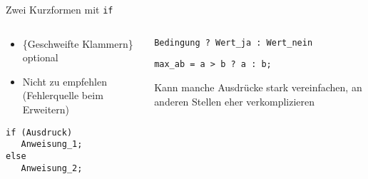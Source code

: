 
\begin{frame}[fragile]{Zwei Kurzformen mit \texttt{if}}
%
\begin{columns}[T]
\begin{tcolorbox}[title=\emph{Einzeilige} \texttt{if}-Blöcke]
\begin{itemize}
\item \{Geschweifte Klammern\} optional
\item Nicht zu empfehlen\newline
	(Fehlerquelle beim Erweitern)
\end{itemize}
\begin{codebox}
\begin{verbatim}
if (Ausdruck)
   Anweisung_1;
else
   Anweisung_2;
\end{verbatim}
\end{codebox}
\end{tcolorbox}
%
\begin{tcolorbox}[title=Bedingte Zuweisung]
%
\begin{codebox}[Syntax]
\scriptsize\texttt{Bedingung ? Wert_ja : Wert_nein}
\end{codebox}
\begin{codebox}[Beispiel]
\scriptsize\texttt{max_ab = a > b  ?  a  :  b;}
\end{codebox}
Kann manche Ausdrücke stark vereinfachen, an anderen Stellen eher verkomplizieren
\end{tcolorbox}
%
\end{columns}
%
\end{frame}


